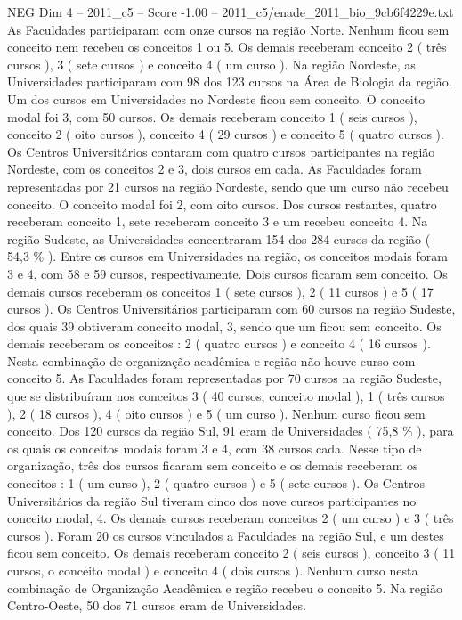 \begin{textsample}{NEG Dim 4 – 2011\_c5 – Score -1.00 – 2011\_c5/enade\_2011\_bio\_9cb6f4229e.txt}
As Faculdades participaram com onze cursos na região Norte.
Nenhum ficou sem conceito nem recebeu os conceitos 1 ou 5.
Os demais receberam conceito 2 ( três cursos ), 3 ( sete cursos ) e conceito 4 ( um curso ).
Na região Nordeste, as Universidades participaram com 98 dos 123 cursos na Área de Biologia da região.
Um dos cursos em Universidades no Nordeste ficou sem conceito.
O conceito modal foi 3, com 50 cursos.
Os demais receberam conceito 1 ( seis cursos ), conceito 2 ( oito cursos ), conceito 4 ( 29 cursos ) e conceito 5 ( quatro cursos ).
Os Centros Universitários contaram com quatro cursos participantes na região Nordeste, com os conceitos 2 e 3, dois cursos em cada.
As Faculdades foram representadas por 21 cursos na região Nordeste, sendo que um curso não recebeu conceito.
O conceito modal foi 2, com oito cursos.
Dos cursos restantes, quatro receberam conceito 1, sete receberam conceito 3 e um recebeu conceito 4.
Na região Sudeste, as Universidades concentraram 154 dos 284 cursos da região ( 54,3 \% ).
Entre os cursos em Universidades na região, os conceitos modais foram 3 e 4, com 58 e 59 cursos, respectivamente.
Dois cursos ficaram sem conceito.
Os demais cursos receberam os conceitos 1 ( sete cursos ), 2 ( 11 cursos ) e 5 ( 17 cursos ).
Os Centros Universitários participaram com 60 cursos na região Sudeste, dos quais 39 obtiveram conceito modal, 3, sendo que um ficou sem conceito.
Os demais receberam os conceitos : 2 ( quatro cursos ) e conceito 4 ( 16 cursos ).
Nesta combinação de organização acadêmica e região não houve curso com conceito 5.
As Faculdades foram representadas por 70 cursos na região Sudeste, que se distribuíram nos conceitos 3 ( 40 cursos, conceito modal ), 1 ( três cursos ), 2 ( 18 cursos ), 4 ( oito cursos ) e 5 ( um curso ).
Nenhum curso ficou sem conceito.
Dos 120 cursos da região Sul, 91 eram de Universidades ( 75,8 \% ), para os quais os conceitos modais foram 3 e 4, com 38 cursos cada.
Nesse tipo de organização, três dos cursos ficaram sem conceito e os demais receberam os conceitos : 1 ( um curso ), 2 ( quatro cursos ) e 5 ( sete cursos ).
Os Centros Universitários da região Sul tiveram cinco dos nove cursos participantes no conceito modal, 4.
Os demais cursos receberam conceitos 2 ( um curso ) e 3 ( três cursos ).
Foram 20 os cursos vinculados a Faculdades na região Sul, e um destes ficou sem conceito.
Os demais receberam conceito 2 ( seis cursos ), conceito 3 ( 11 cursos, o conceito modal ) e conceito 4 ( dois cursos ).
Nenhum curso nesta combinação de Organização Acadêmica e região recebeu o conceito 5.
Na região Centro-Oeste, 50 dos 71 cursos eram de Universidades.

\end{textsample}
